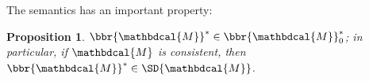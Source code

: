 \documentclass{article}
\theoremstyle{plain}
\newtheorem{prop}[theorem]{Proposition}
\theoremstyle{definition}
\theoremstyle{remark}
\DeclareMathOperator*{\argmin}{arg\;min}
\newcommand{\commentout}[1]{\ignorespaces}
\newcommand{\V}{\mathcal V}
\newcommand{\dg}[1]{\mathbdcal{#1}}
\numberwithin{equation}{section}
\begin{document}
\commentout{
\begin{prop}\label{prop:convex-if-gamma-small}
  If $\dg M$ is a PDG and
  $\gamma < \min_L \beta_L^{\dg M}$, then
  $\bbr{\dg M}_\gamma$ is a strictly convex function of $\mu$.%
\end{prop}

                          
                          
\Cref{prop:convex-if-gamma-small} allows us to define our desired
semantics by ensuring the limit%
	\footnote{$\mu$ is in this limit iff there is a sequence $(\gamma_i, \mu_i)_{i \in \mathbb N}$ with $\gamma_i \to 0$ and $\mu_i \to \mu$ such that $\mu_i \in \bbr{\dg M}_{\gamma_i}$ for all $i$.}
 in \eqref{eq:uniqdist} is well-defined.
	
	\begin{equation}
		 \bbr{\dg M}_* := \lim_{\gamma\to 0^+}\argmin_{\mu \in
				   \Delta\V(\dg M)} \bbr{\dg M}_\gamma(\mu). 
		   \label{eq:uniqdist}
	\end{equation}
}
The semantics has an important property: 
\begin{prop}\label{prop:consist}
$\bbr{\dg M}^* \in \bbr{\dg M}_0^*$; in particular, if $\dg M$ is consistent,
then $\bbr{\dg M}^* \in \SD{\dg  M}$.
\end{prop}

\end{document}
